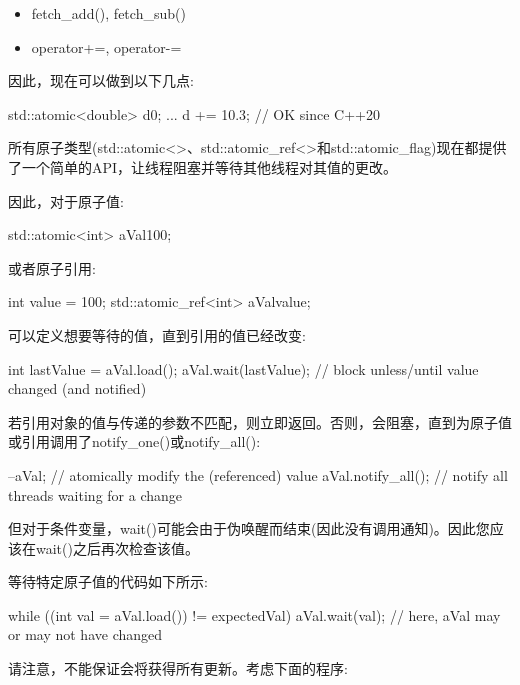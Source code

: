 \begin{itemize}
\item 
fetch\_add(), fetch\_sub()

\item 
operator+=, operator-=
\end{itemize}

因此，现在可以做到以下几点:

\begin{cpp}
std::atomic<double> d{0};
...
d += 10.3; // OK since C++20
\end{cpp}


所有原子类型(std::atomic<>、std::atomic\_ref<>和std::atomic\_flag)现在都提供了一个简单的API，让线程阻塞并等待其他线程对其值的更改。

因此，对于原子值:

\begin{cpp}
std::atomic<int> aVal{100};
\end{cpp}

或者原子引用:

\begin{cpp}
int value = 100;
std::atomic_ref<int> aVal{value};
\end{cpp}

可以定义想要等待的值，直到引用的值已经改变:

\begin{cpp}
int lastValue = aVal.load();
aVal.wait(lastValue); // block unless/until value changed (and notified)
\end{cpp}

若引用对象的值与传递的参数不匹配，则立即返回。否则，会阻塞，直到为原子值或引用调用了notify\_one()或notify\_all():

\begin{cpp}
--aVal; // atomically modify the (referenced) value
aVal.notify_all(); // notify all threads waiting for a change
\end{cpp}

但对于条件变量，wait()可能会由于伪唤醒而结束(因此没有调用通知)。因此您应该在wait()之后再次检查该值。

等待特定原子值的代码如下所示:

\begin{cpp}
while ((int val = aVal.load()) != expectedVal) {
	aVal.wait(val);
	// here, aVal may or may not have changed
}
\end{cpp}

请注意，不能保证会将获得所有更新。考虑下面的程序:

